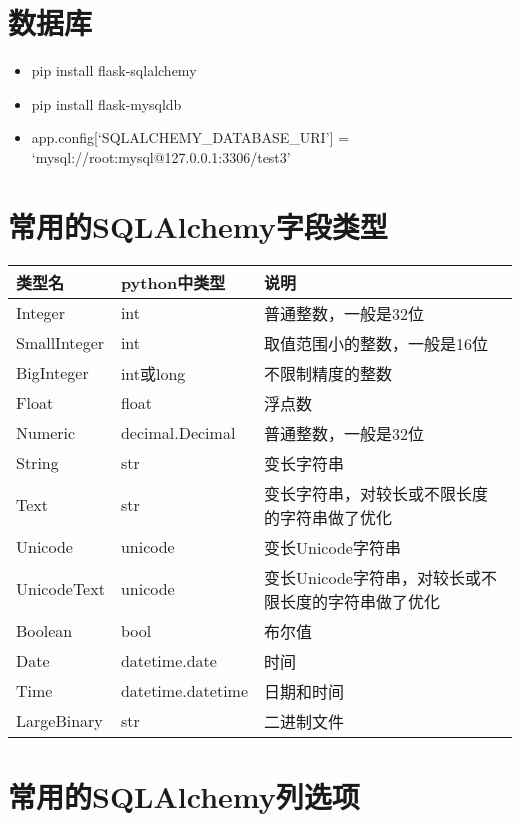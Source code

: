 \documentclass[11pt]{article}
\providecommand{\tightlist}{%
      \setlength{\itemsep}{0pt}\setlength{\parskip}{0pt}}
\newenvironment{Shaded}{}{}
\newcommand{\NormalTok}[1]{{#1}}
\begin{document}
\begin{Shaded}
\end{Shaded}

    \hypertarget{ux6570ux636eux5e93}{%
\section{数据库}\label{ux6570ux636eux5e93}}

\begin{itemize}
\tightlist
\item
  pip install flask-sqlalchemy
\item
  pip install flask-mysqldb
\item
  app.config{[}`SQLALCHEMY\_DATABASE\_URI'{]} =
  `mysql://root:mysql@127.0.0.1:3306/test3'
\end{itemize}

    \hypertarget{ux5e38ux7528ux7684sqlalchemyux5b57ux6bb5ux7c7bux578b}{%
\section{常用的SQLAlchemy字段类型}\label{ux5e38ux7528ux7684sqlalchemyux5b57ux6bb5ux7c7bux578b}}

\begin{longtable}[]{@{}lll@{}}
\toprule
类型名 & python中类型 & 说明\tabularnewline
\midrule
\endhead
Integer & int & 普通整数，一般是32位\tabularnewline
SmallInteger & int & 取值范围小的整数，一般是16位\tabularnewline
BigInteger & int或long & 不限制精度的整数\tabularnewline
Float & float & 浮点数\tabularnewline
Numeric & decimal.Decimal & 普通整数，一般是32位\tabularnewline
String & str & 变长字符串\tabularnewline
Text & str & 变长字符串，对较长或不限长度的字符串做了优化\tabularnewline
Unicode & unicode & 变长Unicode字符串\tabularnewline
UnicodeText & unicode &
变长Unicode字符串，对较长或不限长度的字符串做了优化\tabularnewline
Boolean & bool & 布尔值\tabularnewline
Date & datetime.date & 时间\tabularnewline
Time & datetime.datetime & 日期和时间\tabularnewline
LargeBinary & str & 二进制文件\tabularnewline
\bottomrule
\end{longtable}

    \hypertarget{ux5e38ux7528ux7684sqlalchemyux5217ux9009ux9879}{%
\section{常用的SQLAlchemy列选项}\label{ux5e38ux7528ux7684sqlalchemyux5217ux9009ux9879}}
\end{document}
